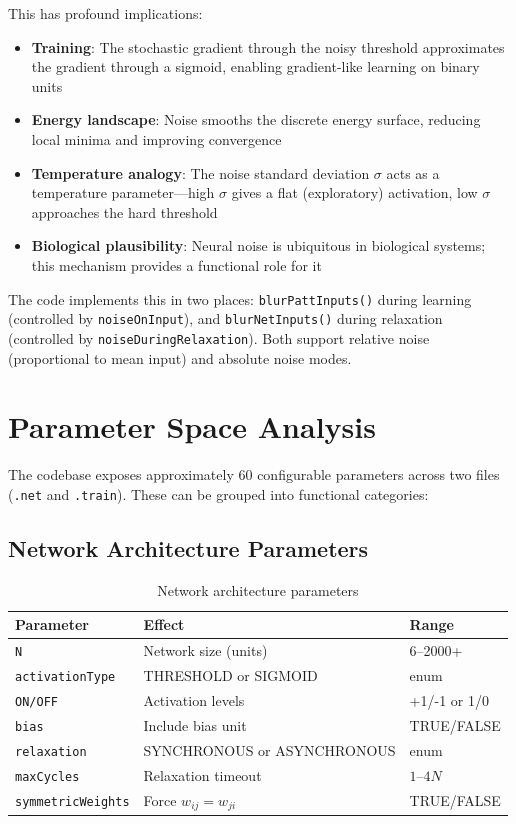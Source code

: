 \documentclass[11pt,a4paper]{article}
\begin{document}
This has profound implications:
\begin{itemize}
    \item \textbf{Training}: The stochastic gradient through the noisy threshold approximates the gradient through a sigmoid, enabling gradient-like learning on binary units
    \item \textbf{Energy landscape}: Noise smooths the discrete energy surface, reducing local minima and improving convergence
    \item \textbf{Temperature analogy}: The noise standard deviation $\sigma$ acts as a temperature parameter---high $\sigma$ gives a flat (exploratory) activation, low $\sigma$ approaches the hard threshold
    \item \textbf{Biological plausibility}: Neural noise is ubiquitous in biological systems; this mechanism provides a functional role for it
\end{itemize}

The code implements this in two places: \texttt{blurPattInputs()} during learning (controlled by \texttt{noiseOnInput}), and \texttt{blurNetInputs()} during relaxation (controlled by \texttt{noiseDuringRelaxation}). Both support relative noise (proportional to mean input) and absolute noise modes.

\section{Parameter Space Analysis}

The codebase exposes approximately 60 configurable parameters across two files (\texttt{.net} and \texttt{.train}). These can be grouped into functional categories:

\subsection{Network Architecture Parameters}
\begin{table}[h]
\centering\small
\begin{tabular}{lp{5cm}l}
\toprule
\textbf{Parameter} & \textbf{Effect} & \textbf{Range} \\
\midrule
\texttt{N} & Network size (units) & 6--2000+ \\
\texttt{activationType} & THRESHOLD or SIGMOID & enum \\
\texttt{ON/OFF} & Activation levels & +1/-1 or 1/0 \\
\texttt{bias} & Include bias unit & TRUE/FALSE \\
\texttt{relaxation} & SYNCHRONOUS or ASYNCHRONOUS & enum \\
\texttt{maxCycles} & Relaxation timeout & $1$--$4N$ \\
\texttt{symmetricWeights} & Force $w_{ij} = w_{ji}$ & TRUE/FALSE \\
\bottomrule
\end{tabular}
\caption{Network architecture parameters}
\end{table}
\end{document}

